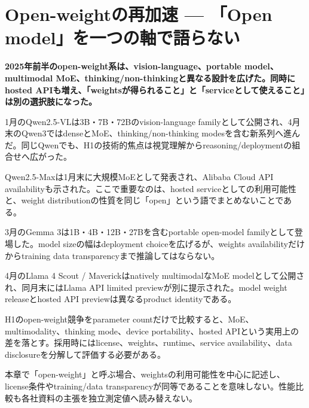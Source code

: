 \section{Open-weightの再加速 — 「Open model」を一つの軸で語らない}
\label{pkg:open}
\noindent\textbf{2025年前半のopen-weight系は、vision-language、portable model、multimodal MoE、thinking/non-thinkingと異なる設計を広げた。同時にhosted APIも増え、「weightsが得られること」と「serviceとして使えること」は別の選択肢になった。}\autocite{src-05f285e9757b,src-1bb16d7254b1,src-3e4a3f3b3d83,src-dc21f366b638}

1月のQwen2.5-VLは3B・7B・72Bのvision-language familyとして公開され、4月末のQwen3ではdenseとMoE、thinking/non-thinking modesを含む新系列へ進んだ。同じQwenでも、H1の技術的焦点は視覚理解からreasoning/deploymentの組合せへ広がった。\autocite{src-3e4a3f3b3d83,src-dc21f366b638}


Qwen2.5-Maxは1月末に大規模MoEとして発表され、Alibaba Cloud API availabilityも示された。ここで重要なのは、hosted serviceとしての利用可能性と、weight distributionの性質を同じ「open」という語でまとめないことである。\autocite{src-8c485019ad8d}


3月のGemma 3は1B・4B・12B・27Bを含むportable open-model familyとして登場した。model sizeの幅はdeployment choiceを広げるが、weights availabilityだけからtraining data transparencyまで推論してはならない。\autocite{src-1bb16d7254b1}


4月のLlama 4 Scout / Maverickはnatively multimodalなMoE modelとして公開され、同月末にはLlama API limited previewが別に提示された。model weight releaseとhosted API previewは異なるproduct identityである。\autocite{src-05f285e9757b,src-fca961b24baf}


H1のopen-weight競争をparameter countだけで比較すると、MoE、multimodality、thinking mode、device portability、hosted APIという実用上の差を落とす。採用時にはlicense、weights、runtime、service availability、data disclosureを分解して評価する必要がある。\autocite{src-05f285e9757b,src-1bb16d7254b1,src-3e4a3f3b3d83}


\begin{claimboundary}
本章で「open-weight」と呼ぶ場合、weightsの利用可能性を中心に記述し、license条件やtraining/data transparencyが同等であることを意味しない。性能比較も各社資料の主張を独立測定値へ読み替えない。
\end{claimboundary}

